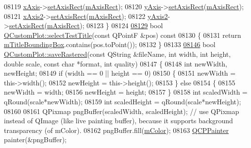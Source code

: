 \begin{DoxyCode}
08119   \hyperlink{a00116_a384438707adbcc96b0fa1324106f7129}{xAxis}->\hyperlink{a00025_a0188c6248366fc9f9ff816dceee986e0}{setAxisRect}(\hyperlink{a00116_aad382d311cfe6a81f47aa4ae3350021b}{mAxisRect});
08120   \hyperlink{a00116_af168096ce67002b1fbce18ae5dd1b652}{yAxis}->\hyperlink{a00025_a0188c6248366fc9f9ff816dceee986e0}{setAxisRect}(\hyperlink{a00116_aad382d311cfe6a81f47aa4ae3350021b}{mAxisRect});
08121   \hyperlink{a00116_a058f6d3a4c86bf94c476e5c380711dba}{xAxis2}->\hyperlink{a00025_a0188c6248366fc9f9ff816dceee986e0}{setAxisRect}(\hyperlink{a00116_aad382d311cfe6a81f47aa4ae3350021b}{mAxisRect});
08122   \hyperlink{a00116_a4fd6679232da7da0a1ae4e1b6ae83d6e}{yAxis2}->\hyperlink{a00025_a0188c6248366fc9f9ff816dceee986e0}{setAxisRect}(\hyperlink{a00116_aad382d311cfe6a81f47aa4ae3350021b}{mAxisRect});
08123 \}
08124 
\hypertarget{a00115_source_l08129}{}\hyperlink{a00116_a2a2d01a092840ac01b16104f7973f831}{08129} \textcolor{keywordtype}{bool} \hyperlink{a00116_a2a2d01a092840ac01b16104f7973f831}{QCustomPlot::selectTestTitle}(\textcolor{keyword}{const} QPointF &pos)\textcolor{keyword}{ const}
08130 \textcolor{keyword}{}\{
08131   \textcolor{keywordflow}{return} \hyperlink{a00116_ab64b411eef7fd9d890c871993116d289}{mTitleBoundingBox}.contains(pos.toPoint());
08132 \}
08133 
\hypertarget{a00115_source_l08146}{}\hyperlink{a00116_ab528b84cf92baabe29b1d0ef2f77c93e}{08146} \textcolor{keywordtype}{bool} \hyperlink{a00116_ab528b84cf92baabe29b1d0ef2f77c93e}{QCustomPlot::saveRastered}(\textcolor{keyword}{const} QString &fileName, \textcolor{keywordtype}{int} width, \textcolor{keywordtype}{int} height, \textcolor{keywordtype}{
      double} scale, \textcolor{keyword}{const} \textcolor{keywordtype}{char} *format, \textcolor{keywordtype}{int} quality)
08147 \{
08148   \textcolor{keywordtype}{int} newWidth, newHeight;
08149   \textcolor{keywordflow}{if} (width == 0 || height == 0)
08150   \{
08151     newWidth = this->width();
08152     newHeight = this->height();
08153   \} \textcolor{keywordflow}{else}
08154   \{
08155     newWidth = width;
08156     newHeight = height;
08157   \}
08158   \textcolor{keywordtype}{int} scaledWidth = qRound(scale*newWidth);
08159   \textcolor{keywordtype}{int} scaledHeight = qRound(scale*newHeight);
08160 
08161   QPixmap pngBuffer(scaledWidth, scaledHeight); \textcolor{comment}{// use QPixmap instead of QImage (like live painting
       buffer), because it supports background transparency (of mColor).}
08162   pngBuffer.fill(\hyperlink{a00116_ac071280171e215ffc7d416118bc28d90}{mColor});
08163   \hyperlink{a00047}{QCPPainter} painter(&pngBuffer);

\end{DoxyCode}
